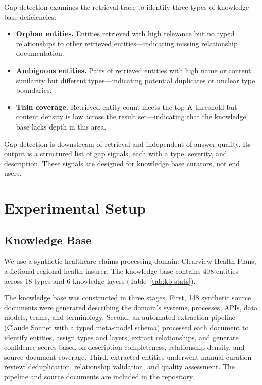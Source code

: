 \documentclass[11pt,a4paper]{article}
\begin{document}
Gap detection examines the retrieval trace to identify three types of knowledge base deficiencies:

\begin{itemize}[nosep]
  \item \textbf{Orphan entities.} Entities retrieved with high relevance but no typed relationships to other retrieved entities---indicating missing relationship documentation.
  \item \textbf{Ambiguous entities.} Pairs of retrieved entities with high name or content similarity but different types---indicating potential duplicates or unclear type boundaries.
  \item \textbf{Thin coverage.} Retrieved entity count meets the top-$K$ threshold but content density is low across the result set---indicating that the knowledge base lacks depth in this area.
\end{itemize}

Gap detection is downstream of retrieval and independent of answer quality. Its output is a structured list of gap signals, each with a type, severity, and description. These signals are designed for knowledge base curators, not end users.

\section{Experimental Setup}
\label{sec:setup}

\subsection{Knowledge Base}

We use a synthetic healthcare claims processing domain: Clearview Health Plans, a fictional regional health insurer. The knowledge base contains 408 entities across 18 types and 6 knowledge layers (Table~\ref{tab:kb-stats}).

The knowledge base was constructed in three stages. First, 148 synthetic source documents were generated describing the domain's systems, processes, APIs, data models, teams, and terminology. Second, an automated extraction pipeline (Claude Sonnet with a typed meta-model schema) processed each document to identify entities, assign types and layers, extract relationships, and generate confidence scores based on description completeness, relationship density, and source document coverage. Third, extracted entities underwent manual curation review: deduplication, relationship validation, and quality assessment. The pipeline and source documents are included in the repository.
\end{document}
